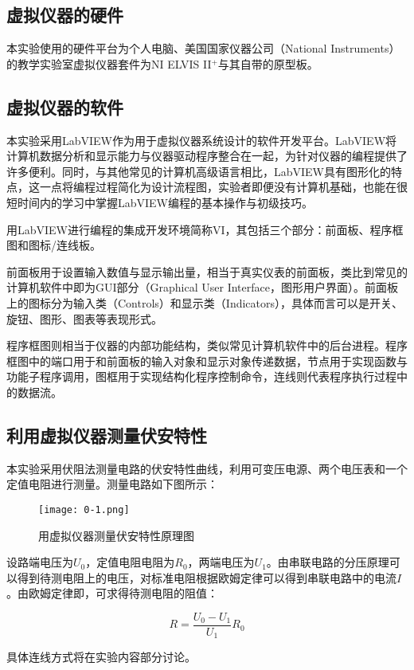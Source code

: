 \documentclass[12pt]{article}
\begin{document}
\subsection{虚拟仪器的硬件}
本实验使用的硬件平台为个人电脑、美国国家仪器公司（National Instruments）的教学实验室虚拟仪器套件为NI ELVIS II$ ^+ $与其自带的原型板。

\subsection{虚拟仪器的软件}
本实验采用LabVIEW作为用于虚拟仪器系统设计的软件开发平台。LabVIEW将计算机数据分析和显示能力与仪器驱动程序整合在一起，为针对仪器的编程提供了许多便利。同时，与其他常见的计算机高级语言相比，LabVIEW具有图形化的特点，这一点将编程过程简化为设计流程图，实验者即便没有计算机基础，也能在很短时间内的学习中掌握LabVIEW编程的基本操作与初级技巧。

用LabVIEW进行编程的集成开发环境简称VI，其包括三个部分：前面板、程序框图和图标/连线板。

前面板用于设置输入数值与显示输出量，相当于真实仪表的前面板，类比到常见的计算机软件中即为GUI部分（Graphical User Interface，图形用户界面）。前面板上的图标分为输入类（Controls）和显示类（Indicators），具体而言可以是开关、旋钮、图形、图表等表现形式。

程序框图则相当于仪器的内部功能结构，类似常见计算机软件中的后台进程。程序框图中的端口用于和前面板的输入对象和显示对象传递数据，节点用于实现函数与功能子程序调用，图框用于实现结构化程序控制命令，连线则代表程序执行过程中的数据流。

\subsection{利用虚拟仪器测量伏安特性}
本实验采用伏阻法测量电路的伏安特性曲线，利用可变压电源、两个电压表和一个定值电阻进行测量。测量电路如下图所示：

\begin{figure}[htbp]
    \centering
    \texttt{[image: 0-1.png]}
    \caption{用虚拟仪器测量伏安特性原理图}
\end{figure}

设路端电压为$U_0$，定值电阻电阻为$R_0$，两端电压为$U_1$。由串联电路的分压原理可以得到待测电阻上的电压，对标准电阻根据欧姆定律可以得到串联电路中的电流$ I $。由欧姆定律即，可求得待测电阻的阻值：

\[R=\frac{U_0-U_1}{U_1}R_0\]

具体连线方式将在实验内容部分讨论。
\end{document}
